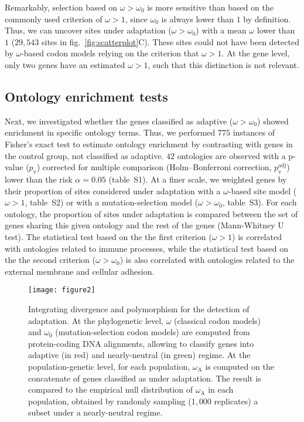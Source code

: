 \documentclass[9pt,twocolumn,twoside,lineno]{pnas-new}
\newcommand{\rateApop}{\omega_{\mathrm{A}}}
\begin{document}
Remarkably, selection based on $\omega>\omega_{0}$ is more sensitive than based on the commonly used criterion of $\omega>1$, since $\omega_{0}$ is always lower than $1$ by definition\cite{spielman_relationship_2015}.
Thus, we can uncover sites under adaptation ($\omega>\omega_{0}$) with a mean $\omega$ lower than $1$ ($29,543$ sites in fig.~\ref{fig:scatterplot}C).
These sites could not have been detected by $\omega$-based codon models relying on the criterion that $\omega>1$.
At the gene level, only two genes have an estimated $\omega > 1$, such that this distinction is not relevant.

\subsection*{Ontology enrichment tests}
Next, we investigated whether the genes classified as adaptive ($\omega > \omega_{0}$) showed enrichment in specific ontology terms.
Thus, we performed $775$ instances of Fisher's exact test to estimate ontology enrichment by contrasting with genes in the control group, not classified as adaptive.
$42$ ontologies are observed with a p-value ($p_{\mathrm{v}}$) corrected for multiple comparison (Holm–Bonferroni correction, $p_{\mathrm{v}}^{\mathrm{adj}}$) lower than the risk $\alpha=0.05$ (table~S1).
At a finer scale, we weighted genes by their proportion of sites considered under adaptation with a $\omega$-based site model ($\omega > 1$, table~S2) or with a mutation-selection model ($\omega > \omega_{0}$, table~S3).
For each ontology, the proportion of sites under adaptation is compared between the set of genes sharing this given ontology and the rest of the genes (Mann-Whitney U test).
The statistical test based on the the first criterion ($\omega>1$) is correlated with ontologies related to immune processes, while the statistical test based on the the second criterion ($\omega > \omega_{0}$) is also correlated with ontologies related to the external membrane and cellular adhesion.

\begin{figure*}[t]
       \centering
       \texttt{[image: figure2]}
       \caption{
              Integrating divergence and polymorphism for the detection of adaptation.
              At the phylogenetic level, $\omega$ (classical codon models) and $\omega_{0}$ (mutation-selection codon models) are computed from protein-coding DNA alignments, allowing to classify genes into adaptive (in red) and nearly-neutral (in green) regime.
              At the population-genetic level, for each population, $\rateApop$ is computed on the concatenate of genes classified as under adaptation.
              The result is compared to the empirical null distribution of $\rateApop$ in each population, obtained by randomly sampling ($1,000$ replicates) a subset under a nearly-neutral regime.
       }
       \label{fig:method}
\end{figure*}
\end{document}
